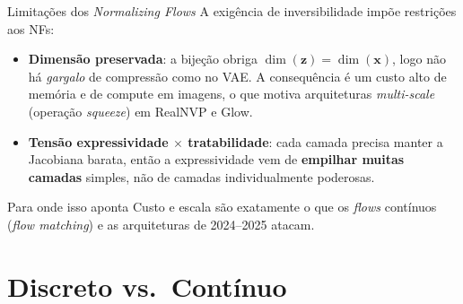 \documentclass[aspectratio=169,xcolor=dvipsnames]{beamer}
\begin{document}
  \begin{frame}{Limitações dos \textit{Normalizing Flows}}
    A exigência de inversibilidade impõe restrições aos NFs:
    \vspace{0.3em}
    \begin{itemize}
      \item \textbf{Dimensão preservada}: a bijeção obriga
      $\dim(\mathbf{z}) = \dim(\mathbf{x})$, logo não há \emph{gargalo} de
      compressão como no VAE. A consequência é um custo alto de memória e de
      compute em imagens, o que motiva arquiteturas \textit{multi-scale} (operação
      \textit{squeeze}) em RealNVP e Glow.
      \item \textbf{Tensão expressividade $\times$ tratabilidade}: cada camada
      precisa manter a Jacobiana barata, então a expressividade vem de
      \textbf{empilhar muitas camadas} simples, não de camadas individualmente
      poderosas.
    \end{itemize}
    \begin{block}{Para onde isso aponta}
      Custo e escala são exatamente o que os \textit{flows} contínuos
      (\textit{flow matching}) e as arquiteturas de 2024--2025 atacam.
    \end{block}
  \end{frame}

  \section{Discreto vs.\ Contínuo}
\end{document}
